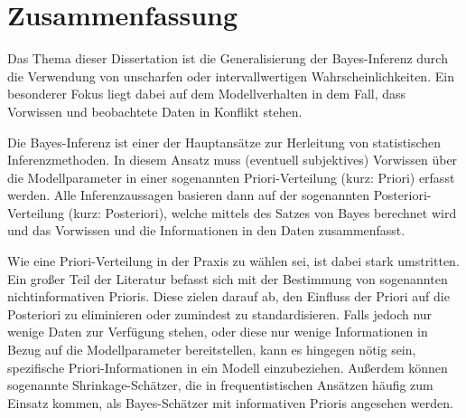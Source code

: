 \chapter*{Zusammenfassung}

Das Thema dieser Dissertation ist die Generalisierung der Bayes-Inferenz
durch die Verwendung von unscharfen oder intervallwertigen Wahrscheinlichkeiten.
Ein besonderer Fokus liegt dabei auf dem Modellverhalten in dem Fall,
dass Vorwissen und beobachtete Daten in Konflikt stehen.

Die Bayes-Inferenz ist einer der Hauptansätze zur Herleitung von statistischen Inferenzmethoden.
In diesem Ansatz muss (eventuell subjektives) Vorwissen über die Modellparameter %
in einer sogenannten Priori-Verteilung (kurz: Priori) erfasst werden.
Alle Inferenzaussagen basieren dann auf der sogenannten Posteriori-Verteilung (kurz: Posteriori),
welche mittels des Satzes von Bayes berechnet wird 
und das Vorwissen und die Informationen in den Daten zusammenfasst.

Wie eine Priori-Verteilung in der Praxis zu wählen sei, ist dabei stark umstritten.
Ein großer Teil der Literatur befasst sich mit der Bestimmung von sogenannten
nichtinformativen Prioris. Diese zielen darauf ab, den Einfluss der Priori auf die Posteriori
zu eliminieren oder zumindest zu standardisieren.
Falls jedoch nur wenige Daten zur Verfügung stehen, oder diese nur wenige Informationen
in Bezug auf die Modellparameter bereitstellen,
kann es hingegen nötig sein, spezifische Priori-Informationen in ein Modell einzubeziehen.
Außerdem können sogenannte Shrinkage-Schätzer, die in frequentistischen Ansätzen häufig zum Einsatz kommen,
als Bayes-Schätzer mit informativen Prioris angesehen werden.

